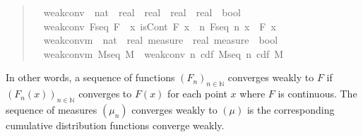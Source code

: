 \documentclass{svjour3}
\newcommand{\NN}{\mathbb{N}}
\begin{document}
\begin{quote}
\begin{isabellebody}
\isamarkupfalse%
\isanewline
\ \ weak{\isacharunderscore}conv\ {\isacharcolon}{\isacharcolon}\ {\isachardoublequoteopen}{\isacharparenleft}nat\ {\isasymRightarrow}\ {\isacharparenleft}real\ {\isasymRightarrow}\ real{\isacharparenright}{\isacharparenright}\ {\isasymRightarrow}\ {\isacharparenleft}real\ {\isasymRightarrow}\ real{\isacharparenright}\ {\isasymRightarrow}\ bool{\isachardoublequoteclose}\isanewline
{}\isanewline
\ \ {\isachardoublequoteopen}weak{\isacharunderscore}conv\ F{\isacharunderscore}seq\ F\ {\isasymequiv}\ {\isasymforall}x{\isachardot}\ isCont\ F\ x\ {\isasymlongrightarrow}\ {\isacharparenleft}{\isasymlambda}n{\isachardot}\ F{\isacharunderscore}seq\ n\ x{\isacharparenright}\ {\isacharminus}{\isacharminus}{\isacharminus}{\isacharminus}{\isachargreater}\ F\ x{\isachardoublequoteclose}\isanewline\isanewline
{}\isamarkupfalse%
\isanewline
\ \ weak{\isacharunderscore}conv{\isacharunderscore}m\ {\isacharcolon}{\isacharcolon}\ {\isachardoublequoteopen}{\isacharparenleft}nat\ {\isasymRightarrow}\ real\ measure{\isacharparenright}\ {\isasymRightarrow}\ real\ measure\ {\isasymRightarrow}\ bool{\isachardoublequoteclose}\isanewline
{}\isanewline
\ \ {\isachardoublequoteopen}weak{\isacharunderscore}conv{\isacharunderscore}m\ M{\isacharunderscore}seq\ M\ {\isasymequiv}\ weak{\isacharunderscore}conv\ {\isacharparenleft}{\isasymlambda}n{\isachardot}\ cdf\ {\isacharparenleft}M{\isacharunderscore}seq\ n{\isacharparenright}{\isacharparenright}\ {\isacharparenleft}cdf\ M{\isacharparenright}{\isachardoublequoteclose}
\end{isabellebody}
\end{quote}
In other words, a sequence of functions $(F_n)_{n \in \NN}$ converges weakly to $F$ if $(F_n(x))_{n \in \NN}$ converges to $F(x)$ for each point $x$ where $F$ is continuous. The sequence of measures $(\mu_n)$ converges weakly to $(\mu)$ is the corresponding cumulative distribution functions converge weakly.
\end{document}
